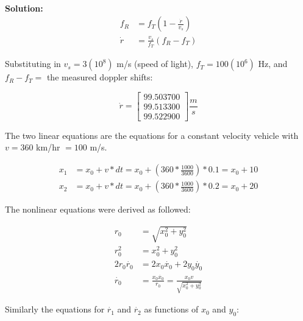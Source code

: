 \documentclass[12pt]{article}
\newcommand{\solution}{\textbf{\\Solution: \\}}
\begin{document}
  \begin{adjustwidth}{10mm}{0mm}
    \solution
    \begin{equation}
      \begin{split}
        f_{R} &= f_{T}(1 - \frac{\dot{r}}{v_{s}}) \\
        \dot{r} &= \frac{v_{s}}{f_{T}}(f_{R} - f_{T})
      \end{split}
    \end{equation}

    Substituting in $v_s = 3(10^8)$ m/s (speed of light), $f_{T} = 100(10^6)$ Hz, 
    and $f_{R} - f_{T} =$ the measured doppler shifts:

    \begin{equation}
      \dot{r} = \begin{bmatrix}
        99.503700 \\[2pt] 99.513300 \\[2pt] 99.522900
      \end{bmatrix}
      \frac{\si{m}}{\si{s}}
    \end{equation}

    The two linear equations are the equations for a constant velocity vehicle
    with $v = 360$ km/hr $= 100$ m/s.
    
    \begin{equation}
      \begin{split}
        x_1 &= x_0 + v*dt = x_0 + (360*\frac{1000}{3600})*0.1 = x_0 + 10 \\
        x_2 &= x_0 + v*dt = x_0 + (360*\frac{1000}{3600})*0.2 = x_0 + 20
      \end{split}
    \end{equation}

    The nonlinear equations were derived as followed:

    \begin{equation}
      \begin{split}
        r_0 &= \sqrt{x_0^2 + y_0^2} \\
        r_0^2 &= x_0^2 + y_0^2 \\
        2r_0\dot{r_0} &= 2x_0\dot{x_0} + 2y_0\dot{y_0} \\
        \dot{r_0} &= \frac{x_0\dot{x_0}}{r_0} = \frac{x_0v}
                                                {\sqrt{x_0^2 + y_0^2}}
      \end{split}
    \end{equation}

    Similarly the equations for $\dot{r_1}$ and $\dot{r_2}$ as functions of 
    $x_0$ and $y_0$:


\end{adjustwidth}
\end{document}
